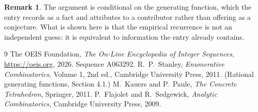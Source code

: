 \documentclass[11pt,a4paper]{article}
\theoremstyle{plain}
\theoremstyle{definition}
\newtheorem{remark}[theorem]{Remark}
\begin{document}
\begin{remark}
The argument is conditional on the generating function, which the entry records as a fact and
attributes to a contributor rather than offering as a conjecture. What is shown here is that
the empirical recurrence is not an independent guess: it is equivalent to information the
entry already contains.
\end{remark}

\begin{thebibliography}{9}
 The OEIS Foundation, \emph{The On-Line Encyclopedia of Integer
Sequences}, \url{https://oeis.org}, 2026. Sequence A063292.
 R.~P.~Stanley, \emph{Enumerative Combinatorics}, Volume 1, 2nd ed.,
Cambridge University Press, 2011. (Rational generating functions, Section 4.1.)
 M.~Kauers and P.~Paule, \emph{The Concrete Tetrahedron}, Springer, 2011.
 P.~Flajolet and R.~Sedgewick, \emph{Analytic Combinatorics}, Cambridge
University Press, 2009.
\end{thebibliography}
\end{document}
